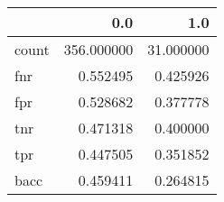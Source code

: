 \begin{tabular}{lrr}
\toprule
{} &         0.0 &        1.0 \\
\midrule
count &  356.000000 &  31.000000 \\
fnr   &    0.552495 &   0.425926 \\
fpr   &    0.528682 &   0.377778 \\
tnr   &    0.471318 &   0.400000 \\
tpr   &    0.447505 &   0.351852 \\
bacc  &    0.459411 &   0.264815 \\
\bottomrule
\end{tabular}
